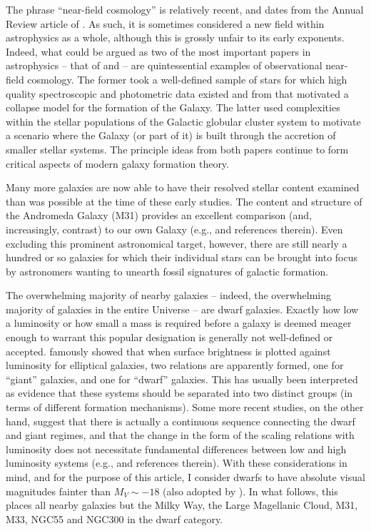 \documentclass[manuscript]{aastex}
\begin{document}
The phrase ``near-field cosmology'' is relatively recent, and dates
from the Annual Review article of \cite{freeman2002}. As such, it is
sometimes considered a new field within astrophysics as a whole,
although this is grossly unfair to its early exponents. Indeed, what
could be argued as two of the most important papers in astrophysics --
that of \cite*{eggen1962} and \cite{searle1978} -- are quintessential
examples of observational near-field cosmology. The former took a
well-defined sample of stars for which high quality spectroscopic and
photometric data existed and from that motivated a collapse model for
the formation of the Galaxy. The latter used complexities within the
stellar populations of the Galactic globular cluster system to
motivate a scenario where the Galaxy (or part of it) is built through
the accretion of smaller stellar systems. The principle ideas from
both papers continue to form critical aspects of modern galaxy
formation theory.

Many more galaxies are now able to have their resolved stellar content
examined than was possible at the time of these early studies. The
content and structure of the Andromeda Galaxy (M31) provides an
excellent comparison (and, increasingly, contrast) to our own Galaxy
(e.g., \cite{courteau2011,huxor2011,
  watkins2010,mcconnachie2009b,yin2009,ibata2007,chapman2007,kalirai2006b,koch2008}
and references therein). Even excluding this prominent astronomical
target, however, there are still nearly a hundred or so galaxies for
which their individual stars can be brought into focus by astronomers
wanting to unearth fossil signatures of galactic formation.

The overwhelming majority of nearby galaxies -- indeed, the
overwhelming majority of galaxies in the entire Universe -- are dwarf
galaxies. Exactly how low a luminosity or how small a mass is required
before a galaxy is deemed meager enough to warrant this popular
designation is generally not well-defined or
accepted. \cite{kormendy1985} famously showed that when surface
brightness is plotted against luminosity for elliptical galaxies, two
relations are apparently formed, one for ``giant'' galaxies, and one
for ``dwarf'' galaxies. This has usually been interpreted as evidence
that these systems should be separated into two distinct groups (in
terms of different formation mechanisms). Some more recent studies, on
the other hand, suggest that there is actually a continuous sequence
connecting the dwarf and giant regimes, and that the change in the form of the scaling
relations with luminosity does not necessitate fundamental differences
between low and high luminosity systems (e.g., \citealt{graham2003}
and references therein). With these considerations in mind, and for
the purpose of this article, I consider dwarfs to have absolute visual
magnitudes fainter than $M_V \sim -18$ (also adopted by
\citealt{grebel2003}). In what follows, this places all nearby galaxies
but the Milky Way, the Large Magellanic Cloud, M31, M33, NGC55 and
NGC300 in the dwarf category.
\end{document}
